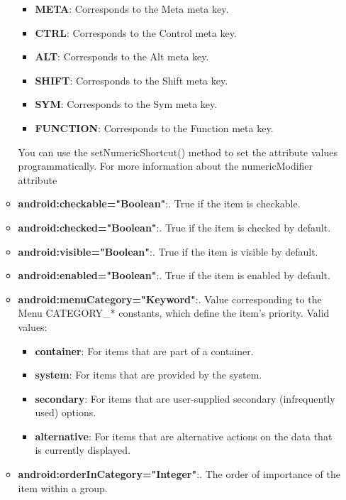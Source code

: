 \documentclass{report}
\begin{document}
\begin{itemize}
\begin{itemize}
                    \begin{itemize}
                        \item \textbf{META}:	Corresponds to the Meta meta key.
                        \item \textbf{CTRL}:	Corresponds to the Control meta key.
                        \item \textbf{ALT}:	Corresponds to the Alt meta key.
                        \item \textbf{SHIFT}:	Corresponds to the Shift meta key.
                        \item \textbf{SYM}:	Corresponds to the Sym meta key.
                        \item \textbf{FUNCTION}:	Corresponds to the Function meta key.
                    \end{itemize}
                    You can use the setNumericShortcut() method to set the attribute values programmatically. For more information about the numericModifier attribute
                \item \textbf{android:checkable="Boolean"}:. True if the item is checkable.
                \item \textbf{android:checked="Boolean"}:. True if the item is checked by default.
                \item \textbf{android:visible="Boolean"}:. True if the item is visible by default.
                \item \textbf{android:enabled="Boolean"}:. True if the item is enabled by default.
                \item \textbf{android:menuCategory="Keyword"}:. Value corresponding to the Menu CATEGORY\_* constants, which define the item's priority. Valid values:
                    \begin{itemize}
                        \item \textbf{container}:	For items that are part of a container.
                        \item \textbf{system}:	For items that are provided by the system.
                        \item \textbf{secondary}:	For items that are user-supplied secondary (infrequently used) options.
                        \item \textbf{alternative}:	For items that are alternative actions on the data that is currently displayed.  
                    \end{itemize}
                \item \textbf{android:orderInCategory="Integer"}:. The order of importance of the item within a group.

\end{itemize}
\end{itemize}
\end{document}
